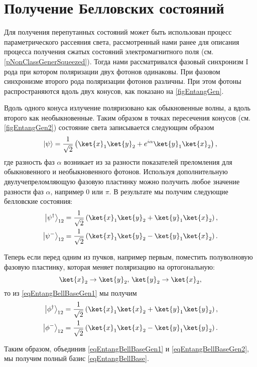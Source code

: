 \section{Получение Белловских состояний}
\label{subsecPart3NonclassEntanglBelGener}

Для получения перепутанных состояний может быть использован процесс
параметрического рассеяния света, рассмотренный нами ранее для
описания процесса получения сжатых состояний электромагнитного
поля (см. \ref{pNonClassGenerSqueezed}). Тогда нами рассматривался
фазовый синхронизм I рода при котором поляризации двух фотонов
одинаковы. При фазовом синхронизме второго рода поляризации фотонов
различны. При этом фотоны распространяются вдоль двух конусов, как
показано на \autoref{figEntangGen}. 



Вдоль одного конуса излучение поляризовано
как обыкновенные волны, а вдоль второго как необыкновенные. Таким
образом в точках пересечения конусов (см. \autoref{figEntangGen2})
состояние света записывается следующим образом
\begin{equation}
\left|\psi\right> =
  \frac{1}{\sqrt{2}}\left(
  \ket{x}_1\ket{y}_2 + e^{i \alpha}
  \ket{y}_1\ket{x}_2
  \right),
\nonumber
\end{equation}
где разность фаз $\alpha$ возникает из за разности показателей
преломления для обыкновенного и необыкновенного фотонов. Используя
дополнительную двулучепреломляющую фазовую пластинку можно получить
любое значение разности фаз
$\alpha$, например $0$ или $\pi$. В результате мы получим следующие белловские состояния:
\begin{eqnarray}
  \left|\psi^{\dag}\right>_{12} = 
  \frac{1}{\sqrt{2}}\left(
  \ket{x}_1\ket{y}_2 + 
  \ket{y}_1\ket{x}_2
  \right),
  \nonumber \\
  \left|\psi^{-}\right>_{12} = 
  \frac{1}{\sqrt{2}}\left(
  \ket{x}_1\ket{y}_2 - 
  \ket{y}_1\ket{x}_2
  \right).
  \label{eqEntangBellBaseGen1}
\end{eqnarray}



Теперь если перед одним из пучков, например первым, поместить полуволновую фазовую
пластинку, которая меняет поляризацию на ортогональную:
\begin{equation}
\ket{x}_2 \rightarrow \ket{y}_2, \, \ket{y}_2 \rightarrow \ket{x}_2,
\nonumber
\end{equation}
то из \eqref{eqEntangBellBaseGen1} мы получим
\begin{eqnarray}
  \left|\phi^{\dag}\right>_{12} = 
  \frac{1}{\sqrt{2}}\left(
  \ket{x}_1\ket{x}_2 + 
  \ket{y}_1\ket{y}_2
  \right),
  \nonumber \\
  \left|\phi^{-}\right>_{12} = 
  \frac{1}{\sqrt{2}}\left(
  \ket{x}_1\ket{x}_2 - 
  \ket{y}_1\ket{y}_2
  \right).
  \label{eqEntangBellBaseGen2}
\end{eqnarray}

Таким образом, объединив \eqref{eqEntangBellBaseGen1} и
\eqref{eqEntangBellBaseGen2}, мы получим полный базис \eqref{eqEntangBellBase}.



